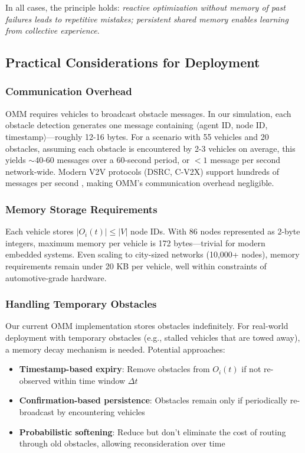 \documentclass[conference]{IEEEtran}
\begin{document}
In all cases, the principle holds: \textit{reactive optimization without memory of past failures leads to repetitive mistakes; persistent shared memory enables learning from collective experience}.

\subsection{Practical Considerations for Deployment}

\subsubsection{Communication Overhead}

OMM requires vehicles to broadcast obstacle messages. In our simulation, each obstacle detection generates one message containing $\langle$agent ID, node ID, timestamp$\rangle$—roughly 12-16 bytes. For a scenario with 55 vehicles and 20 obstacles, assuming each obstacle is encountered by 2-3 vehicles on average, this yields $\sim$40-60 messages over a 60-second period, or $<1$ message per second network-wide. Modern V2V protocols (DSRC, C-V2X) support hundreds of messages per second \cite{tie2024v2x}, making OMM's communication overhead negligible.

\subsubsection{Memory Storage Requirements}

Each vehicle stores $|O_i(t)| \leq |V|$ node IDs. With 86 nodes represented as 2-byte integers, maximum memory per vehicle is 172 bytes—trivial for modern embedded systems. Even scaling to city-sized networks (10,000+ nodes), memory requirements remain under 20 KB per vehicle, well within constraints of automotive-grade hardware.

\subsubsection{Handling Temporary Obstacles}

Our current OMM implementation stores obstacles indefinitely. For real-world deployment with temporary obstacles (e.g., stalled vehicles that are towed away), a memory decay mechanism is needed. Potential approaches:
\begin{itemize}
    \item \textbf{Timestamp-based expiry}: Remove obstacles from $O_i(t)$ if not re-observed within time window $\Delta t$
    \item \textbf{Confirmation-based persistence}: Obstacles remain only if periodically re-broadcast by encountering vehicles
    \item \textbf{Probabilistic softening}: Reduce but don't eliminate the cost of routing through old obstacles, allowing reconsideration over time
\end{itemize}
\end{document}
